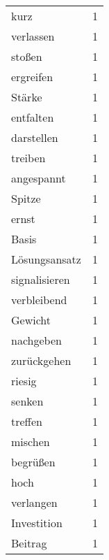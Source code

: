 \begin{tabular}{lr}
kurz & 1 \\
verlassen & 1 \\
stoßen & 1 \\
ergreifen & 1 \\
Stärke & 1 \\
entfalten & 1 \\
darstellen & 1 \\
treiben & 1 \\
angespannt & 1 \\
Spitze & 1 \\
ernst & 1 \\
Basis & 1 \\
Lösungsansatz & 1 \\
signalisieren & 1 \\
verbleibend & 1 \\
Gewicht & 1 \\
nachgeben & 1 \\
zurückgehen & 1 \\
riesig & 1 \\
senken & 1 \\
treffen & 1 \\
mischen & 1 \\
begrüßen & 1 \\
hoch & 1 \\
verlangen & 1 \\
Investition & 1 \\
Beitrag & 1 \\
\bottomrule
\end{tabular}
